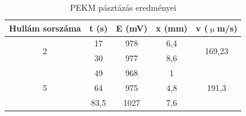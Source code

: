 \begin{table}[] 
\centering
\caption{PEKM pásztázás eredményei}
\label{hullam}
\begin{tabular}{|c|c|c|c|c|}
\hline
\textbf{Hullám sorszáma} & \textbf{t (s)} & \textbf{E (mV)} & \textbf{x (mm)} & \textbf{v ($\upmu$m/s)}        \\ \hline
\multirow{2}{*}{2}       & 17             & 978             & 6,4             & \multirow{2}{*}{169,23} \\ \cline{2-4}
                         & 30             & 977             & 8,6             &                         \\ \hline
\multirow{3}{*}{5}       & 49             & 968             & 1               & \multirow{3}{*}{191,3}  \\ \cline{2-4}
                         & 64             & 975             & 4,8             &                         \\ \cline{2-4}
                         & 83,5           & 1027            & 7,6             &                         \\ \hline
\end{tabular}
\end{table}

